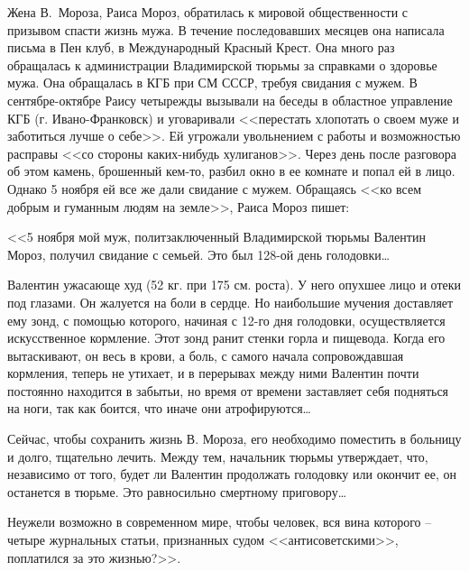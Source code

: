 \documentclass{book}
\begin{document}
Жена В.~Мороза, Раиса Мороз, обратилась к мировой общественности с призывом спасти жизнь мужа. В течение последовавших месяцев она написала письма в Пен клуб, в Международный Красный Крест. Она много раз обращалась к администрации Владимирской тюрьмы за справками о здоровье мужа. Она обращалась в КГБ при СМ СССР, требуя свидания с мужем. В сентябре-октябре Раису четырежды вызывали на бесе­ды в областное управление КГБ (г. Ивано-Франковск) и уговаривали <<перестать хлопотать о своем муже и заботиться лучше о себе>>. Ей угрожали увольнением с работы и возможностью расправы <<со стороны каких-нибудь хулиганов>>. Через день после разговора об этом камень, брошенный кем-то, разбил окно в ее комнате и попал ей в лицо. Однако 5 ноября ей все же дали свидание с мужем. Обращаясь <<ко всем добрым и гуманным людям на земле>>, Раиса Мороз пишет:

<<5 ноября мой муж, политзаключенный Владимирской тюрьмы Валентин Мороз, получил свидание с семьей. Это был 128-ой день голодовки\ldots

Валентин ужасающе худ (52 кг. при 175 см. роста). У него опухшее лицо и отеки под глазами. Он жалуется на боли в сердце. Но наибольшие мучения доставляет ему зонд, с помощью которого, начиная с 12-го дня голодовки, осуществляется искусственное кормление. Этот зонд ранит стенки горла и пищевода. Когда его вытаскивают, он весь в крови, а боль, с самого начала сопровождавшая кормления, теперь не утихает, и в перерывах между ними Валентин почти постоянно находится в забытьи, но время от времени заставляет себя подняться на ноги, так как боится, что иначе они атрофируются\ldots

Сейчас, чтобы сохранить жизнь В. Мороза, его необходимо поместить в больницу и долго, тщательно лечить. Между тем, начальник тюрьмы утверждает, что, независимо от того, будет ли Валентин продолжать голодовку или окончит ее, он останется в тюрьме. Это равносильно смертному приговору\ldots

Неужели возможно в современном мире, чтобы человек, вся вина которого -- четыре журнальных статьи, признанных судом <<антисоветскими>>, поплатился за это жизнью?>>.
\end{document}

